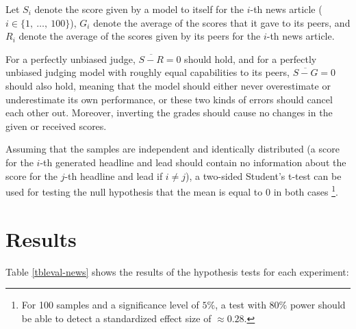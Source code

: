 \documentclass[UTF8,noindent,nohyp,parspace,titlepage,twoside,12pt]{article}
\begin{document}
      Let $S_i$ denote the score given by a model to itself for the $i$-th news
      article ($i \in \{ 1,\ \dots,\ 100 \}$), $G_i$ denote the average of the
      scores that it gave to its peers, and $R_i$ denote the average of the
      scores given by its peers for the $i$-th news article.

      For a perfectly unbiased judge, $\overline{S - R} = 0$ should hold, and
      for a perfectly unbiased judging model with roughly equal capabilities to
      its peers, $\overline{S - G} = 0$ should also hold, meaning that the
      model should either never overestimate or underestimate its own
      performance, or these two kinds of errors should cancel each other out.
      Moreover, inverting the grades should cause no changes in the given or
      received scores.

      Assuming that the samples are independent and identically distributed
      (a score for the $i$-th generated headline and lead should contain no
      information about the score for the $j$-th headline and lead if
      $i \neq j$), a two-sided Student's t-test can be used for testing the null
      hypothesis that the mean is equal to 0 in both cases \footnote{For
      100 samples and a significance level of $5\%$, a test with $80\%$ power
      should be able to detect a standardized effect size of $\approx 0.28$.}.

  \section{Results}

    Table \ref{tbleval-news} shows the results of the hypothesis tests for each
    experiment:
\end{document}

